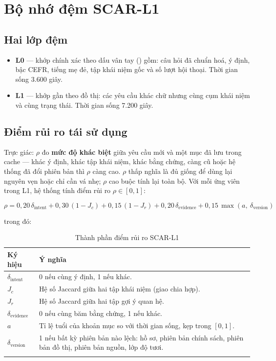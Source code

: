 \section{Bộ nhớ đệm SCAR-L1}

\subsection{Hai lớp đệm}

\begin{itemize}[leftmargin=1.4em]
  \item \textbf{L0} — khớp chính xác theo dấu vân tay () gồm: câu hỏi đã
  chuẩn hoá, ý định, bậc CEFR, tiếng mẹ đẻ, tập khái niệm gốc và số lượt hội thoại. Thời
  gian sống 3.600 giây.
  \item \textbf{L1} — khớp gần theo  đồ thị: các yêu cầu khác chữ nhưng cùng
  cụm khái niệm và cùng trạng thái. Thời gian sống 7.200 giây.
\end{itemize}

\subsection{Điểm rủi ro tái sử dụng}

Trực giác: \(\rho\) đo \textbf{mức độ khác biệt} giữa yêu cầu mới và một mục đã lưu trong
cache — khác ý định, khác tập khái niệm, khác bằng chứng, càng cũ hoặc hệ thống đã đổi
phiên bản thì \(\rho\) càng cao. \(\rho\) thấp nghĩa là đủ giống để dùng lại nguyên vẹn
hoặc chỉ cần vá nhẹ; \(\rho\) cao buộc tính lại toàn bộ. Với mỗi ứng viên trong L1, hệ
thống tính điểm rủi ro \(\rho \in [0,1]\):

\begin{equation}
\rho = 0{,}20\,\delta_{\text{intent}}
     + 0{,}30\,(1 - J_c)
     + 0{,}15\,(1 - J_r)
     + 0{,}20\,\delta_{\text{evidence}}
     + 0{,}15\,\max(a,\ \delta_{\text{version}})
\end{equation}

trong đó:

\begin{longtable}{L{3.0cm} L{10.6cm}}
\toprule
\textbf{Ký hiệu} & \textbf{Ý nghĩa}\\
\midrule
\endhead
\(\delta_{\text{intent}}\) & 0 nếu cùng ý định, 1 nếu khác.\\
\(J_c\) & Hệ số Jaccard giữa hai tập khái niệm (giao chia hợp).\\
\(J_r\) & Hệ số Jaccard giữa hai tập gợi ý quan hệ.\\
\(\delta_{\text{evidence}}\) & 0 nếu cùng băm bằng chứng, 1 nếu khác.\\
\(a\) & Tỉ lệ tuổi của khoản mục so với thời gian sống, kẹp trong \([0,1]\).\\
\(\delta_{\text{version}}\) & 1 nếu bất kỳ phiên bản nào lệch:  hồ sơ, phiên bản chính sách, phiên bản đồ thị, phiên bản nguồn, lớp độ tươi.\\
\bottomrule
\caption{Thành phần điểm rủi ro SCAR-L1}
\end{longtable}

